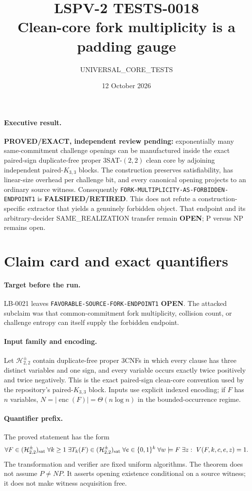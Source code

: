 \documentclass[11pt]{article}
\title{LSPV-2 TESTS-0018\\Clean-core fork multiplicity is a padding gauge}
\author{UNIVERSAL\_CORE\_TESTS}
\date{12 October 2026}
\begin{document}
\maketitle

\paragraph{Executive result.}
\textbf{PROVED/EXACT, independent review pending:} exponentially many
same-commitment challenge openings can be manufactured inside the exact
paired-sign duplicate-free proper $3$SAT-$(2,2)$ clean core by adjoining
independent paired-$K_{3,3}$ blocks.  The construction preserves
satisfiability, has linear-size overhead per challenge bit, and every
canonical opening projects to an ordinary source witness.  Consequently
\texttt{FORK-MULTIPLICITY-AS-FORBIDDEN-ENDPOINT1} is
\textbf{FALSIFIED/RETIRED}.  This does not refute a construction-specific
extractor that yields a genuinely forbidden object.  That endpoint and its
arbitrary-decider SAME\_REALIZATION transfer remain \textbf{OPEN}; P versus
NP remains open.

\section{Claim card and exact quantifiers}

\paragraph{Target before the run.}
LB-0021 leaves \texttt{FAVORABLE-SOURCE-FORK-ENDPOINT1} \textbf{OPEN}.
The attacked subclaim was that common-commitment fork multiplicity, collision
count, or challenge entropy can itself supply the forbidden endpoint.

\paragraph{Input family and encoding.}
Let $\mathcal H_{2,2}^{\pm}$ contain duplicate-free proper $3$CNFs in which
every clause has three distinct variables and one sign, and every variable
occurs exactly twice positively and twice negatively.  This is the exact
paired-sign clean-core convention used by the repository's paired-$K_{3,3}$
block.  Inputs use explicit indexed encoding; if $F$ has $n$ variables,
$N=|\operatorname{enc}(F)|=\Theta(n\log n)$ in the bounded-occurrence regime.

\paragraph{Quantifier prefix.}
The proved statement has the form
\[
 \forall F\in(\mathcal H_{2,2}^{\pm})_{\rm sat}\;
 \forall k\ge1\;\exists T_k(F)\in(\mathcal H_{2,2}^{\pm})_{\rm sat}\;
 \forall e\in\{0,1\}^k\;\forall w\models F\;\exists z:\
 V(F,k,c,e,z)=1.
\]
The transformation and verifier are fixed uniform algorithms.  The theorem
does not assume $P\ne NP$.  It asserts opening existence conditional on a
source witness; it does not make witness acquisition free.
\end{document}
